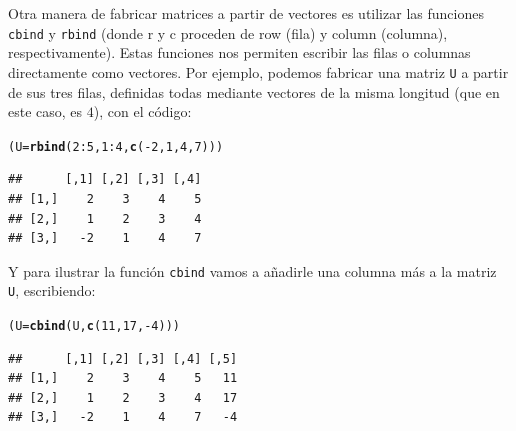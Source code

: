 \documentclass[10pt,a4paper]{article}\usepackage[]{graphicx}\usepackage[]{color}
\makeatletter
\newcommand{\hlnum}[1]{\textcolor[rgb]{0.686,0.059,0.569}{#1}}%
\newcommand{\hlopt}[1]{\textcolor[rgb]{0,0,0}{#1}}%
\newcommand{\hlstd}[1]{\textcolor[rgb]{0.345,0.345,0.345}{#1}}%
\newcommand{\hlkwb}[1]{\textcolor[rgb]{0.69,0.353,0.396}{#1}}%
\newcommand{\hlkwd}[1]{\textcolor[rgb]{0.737,0.353,0.396}{\textbf{#1}}}%
\newenvironment{kframe}{%
 \def\at@end@of@kframe{}%
 \ifinner\ifhmode%
  \def\at@end@of@kframe{\end{minipage}}%
  \begin{minipage}{\columnwidth}%
 \fi\fi%
 \def\FrameCommand##1{\hskip\@totalleftmargin \hskip-\fboxsep
 \colorbox{shadecolor}{##1}\hskip-\fboxsep
     \hskip-\linewidth \hskip-\@totalleftmargin \hskip\columnwidth}%
 \MakeFramed {\advance\hsize-\width
   \@totalleftmargin\z@ \linewidth\hsize
   \@setminipage}}%
 {\par\unskip\endMakeFramed%
 \at@end@of@kframe}
\newenvironment{knitrout}{}{} %
\makeatother
\begin{document}
Otra manera de fabricar matrices a partir de vectores es utilizar las funciones {\tt cbind} y {\tt rbind} (donde r y c proceden de row (fila) y column (columna), respectivamente). Estas funciones nos permiten escribir las filas o columnas directamente como vectores. Por ejemplo, podemos fabricar una matriz {\tt U} a partir de sus tres filas, definidas todas mediante vectores de la misma longitud (que en este caso, es $4$), con el código:
\begin{knitrout}
\color{fgcolor}\begin{kframe}
\begin{alltt}
\hlstd{(U} \hlkwb{=} \hlkwd{rbind}\hlstd{(}\hlnum{2}\hlopt{:}\hlnum{5}\hlstd{,} \hlnum{1}\hlopt{:}\hlnum{4}\hlstd{,} \hlkwd{c}\hlstd{(}\hlopt{-}\hlnum{2}\hlstd{,}\hlnum{1}\hlstd{,}\hlnum{4}\hlstd{,}\hlnum{7}\hlstd{)))}
\end{alltt}
\begin{verbatim}
##      [,1] [,2] [,3] [,4]
## [1,]    2    3    4    5
## [2,]    1    2    3    4
## [3,]   -2    1    4    7
\end{verbatim}
\end{kframe}
\end{knitrout}
     Y para ilustrar la función {\tt cbind} vamos a añadirle una columna más a la matriz {\tt U}, escribiendo:
\begin{knitrout}
\color{fgcolor}\begin{kframe}
\begin{alltt}
\hlstd{(U} \hlkwb{=} \hlkwd{cbind}\hlstd{(U,} \hlkwd{c}\hlstd{(}\hlnum{11}\hlstd{,}\hlnum{17}\hlstd{,}\hlopt{-}\hlnum{4}\hlstd{)))}
\end{alltt}
\begin{verbatim}
##      [,1] [,2] [,3] [,4] [,5]
## [1,]    2    3    4    5   11
## [2,]    1    2    3    4   17
## [3,]   -2    1    4    7   -4
\end{verbatim}
\end{kframe}
\end{knitrout}
     
\end{document}
